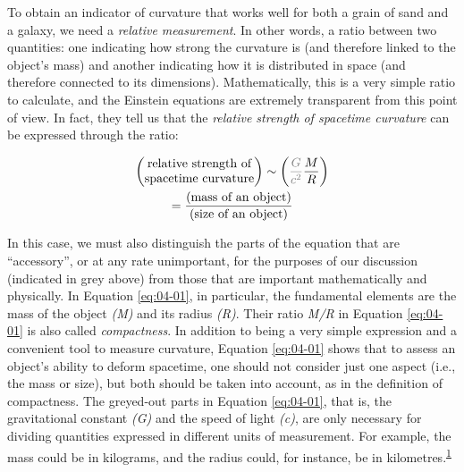 To obtain an indicator of curvature that works well for both a grain of sand and a
galaxy, we need a \emph{relative measurement}. In other words, a ratio between two
quantities: one indicating how strong the curvature is (and therefore linked to the
object's mass) and another indicating how it is distributed in space (and therefore
connected to its dimensions). Mathematically, this is a very simple ratio to calculate,
and the Einstein equations are extremely transparent from this point of view. In fact,
they tell us that the \emph{relative strength of spacetime curvature} can be expressed
through the ratio: 

\begin{equation}\label{eq:04-01}
\begin{gathered}
\begin{pmatrix}\text{relative strength of} \\ \text{spacetime curvature}\end{pmatrix}
\sim \left(\textcolor{gray}{\frac{G}{c^{2}}}\frac{M}{R}\right) \\
= \frac{(\text{mass of an object})}{(\text{size of an object})}
\end{gathered}
\end{equation}


In this case, we must also distinguish the parts of the equation that are ``accessory'',
or at any rate unimportant, for the purposes of our discussion (indicated in grey above)
from those that are important mathematically and physically. In Equation \eqref{eq:04-01}, in
particular, the fundamental elements are the mass of the object \emph{(M)} and its
radius \emph{(R)}. Their ratio \emph{M/R} in Equation \eqref{eq:04-01} is also called
\emph{compactness}. In addition to being a very simple expression and
a convenient tool to measure curvature, Equation \eqref{eq:04-01} shows that to assess an object's
ability to deform spacetime, one should not consider just one aspect (i.e., the mass or
size), but both should be taken into account, as in the definition of compactness. The
greyed-out parts in Equation \eqref{eq:04-01}, that is, the gravitational constant \emph{(G)} and
the speed of light \emph{(c)}, are only necessary for dividing quantities expressed in
different units of measurement. For example, the mass could be in kilograms, and the
radius could, for instance, be in kilometres.\textsuperscript{\hyperlink{note:04-01}{1}}

